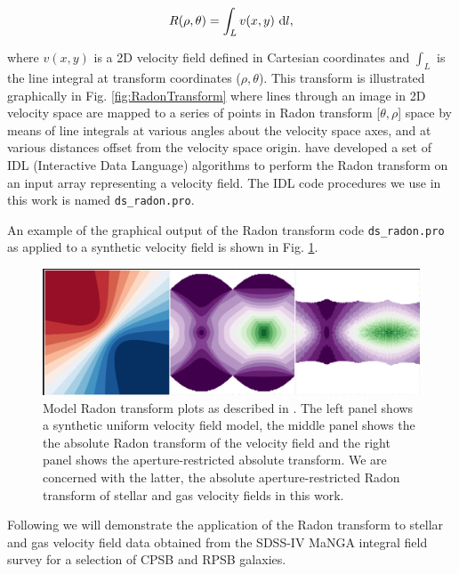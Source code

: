 \begin{equation}
    \label{eqn:radon}
    R(\rho,\theta)=\int_{L}{v(x,y)\, \mathop{}\!\mathrm{d} l},
\end{equation}

where $v(x,y)$ is a 2D velocity field defined in Cartesian coordinates and $\int_{L}$ is the line integral at transform coordinates ($\rho,\theta$). This transform is illustrated graphically in Fig. \ref{fig:RadonTransform} where lines through an image in 2D velocity space are mapped to a series of points in Radon transform [$\theta,\rho$] space by means of line integrals at various angles about the velocity space axes, and at various distances offset from the velocity space origin. \citet{2018MNRAS.480.2217S} have developed a set of IDL (Interactive Data Language) algorithms to perform the Radon transform on an input array representing a velocity field. The IDL code procedures we use in this work is named \texttt{ds\_radon.pro}.

An example of the graphical output of the Radon transform code \texttt{ds\_radon.pro} as applied to a synthetic velocity field is shown in Fig. \ref{fig:Radon}.

\begin{figure}
    \centering
   	\includegraphics[width=\columnwidth]{images/RadonPlots/example2.png}
    \caption{Model Radon transform plots as described in \citet{2018MNRAS.480.2217S}. The left panel shows a synthetic uniform velocity field model, the middle panel shows the the absolute Radon transform of the velocity field and the right panel shows the aperture-restricted absolute transform. We are concerned with the latter, the absolute aperture-restricted  Radon transform of stellar and gas velocity fields in this work.}
    \label{fig:Radon}
\end{figure}

Following \citet{2018MNRAS.480.2217S} we will demonstrate the application of the Radon transform to stellar and gas velocity field data obtained from the SDSS-IV MaNGA integral field survey for a selection of CPSB and RPSB galaxies.  

